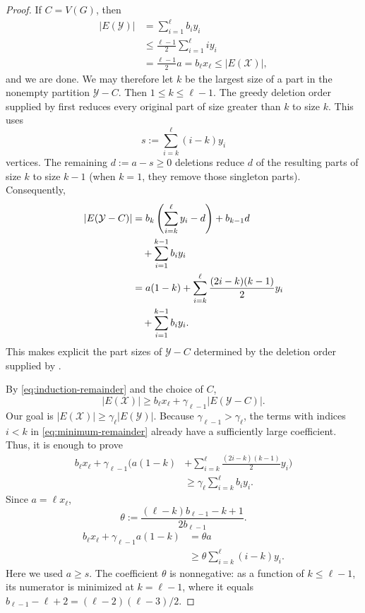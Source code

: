 \documentclass[a4paper,fleqn]{cas-sc}
\theoremstyle{remark}
\theoremstyle{plain}
\begin{document}
\begin{proof}
If $C=V(G)$, then
\begin{align*}
   |E(\mathcal{Y})|
   &=\sum_{i=1}^{\ell}b_i y_i\\
   &\leq \frac{\ell-1}{2}\sum_{i=1}^{\ell}i y_i\\
   &=\frac{\ell-1}{2}a
   =b_\ell x_\ell
   \leq |E(\mathcal{X})|,
\end{align*}
and we are done. We may therefore let $k$ be the largest size of a
part in the nonempty partition $\mathcal{Y}-C$. Then
$1\leq k\leq\ell-1$. The greedy deletion order supplied by
 first reduces every original part of size greater
than $k$ to size $k$. This uses
\[
   s:=\sum_{i=k}^{\ell}(i-k)y_i
\]
vertices. The remaining $d:=a-s\geq 0$ deletions reduce $d$ of the
resulting parts of size $k$ to size $k-1$ (when $k=1$, they remove
those singleton parts). Consequently,
\begin{align}
|E(\mathcal{Y}-C)|
 &=b_k\left(\sum_{i=k}^{\ell}y_i-d\right)
   +b_{k-1}d \notag\\
 &\quad+\sum_{i=1}^{k-1}b_i y_i \notag\\
 &=a(1-k)
   +\sum_{i=k}^{\ell}
      \frac{(2i-k)(k-1)}{2}y_i \notag\\
 &\quad
   +\sum_{i=1}^{k-1}b_i y_i. \label{eq:minimum-remainder}
\end{align}
This makes explicit the part sizes of $\mathcal{Y}-C$ determined by
the deletion order supplied by .

By \eqref{eq:induction-remainder} and the choice of $C$,
\begin{equation} \label{eq:algorithm-lower-bound}
|E(\mathcal{X})|
\geq b_\ell x_\ell+\gamma_{\ell-1}|E(\mathcal{Y}-C)|.
\end{equation}
Our goal is $|E(\mathcal{X})|\geq\gamma_\ell|E(\mathcal{Y})|$.
Because $\gamma_{\ell-1}>\gamma_\ell$, the terms with indices
$i<k$ in \eqref{eq:minimum-remainder} already have a sufficiently
large coefficient. Thus, it is enough to prove
\begin{equation} \label{eq:reduced-target}
\begin{split}
b_\ell x_\ell+\gamma_{\ell-1}\biggl(
a(1-k)&+
\sum_{i=k}^{\ell}\frac{(2i-k)(k-1)}{2}y_i\biggr)\\
&\geq\gamma_\ell\sum_{i=k}^{\ell}b_i y_i.
\end{split}
\end{equation}
Since $a=\ell x_\ell$,
\[
\theta:=\frac{(\ell-k)b_{\ell-1}-k+1}{2b_{\ell-1}}.
\]
\begin{align*}
b_\ell x_\ell+\gamma_{\ell-1}a(1-k)
 &=\theta a\\
 &\geq \theta\sum_{i=k}^{\ell}(i-k)y_i.
\end{align*}
Here we used $a\geq s$. The coefficient $\theta$ is nonnegative: as a
function of $k\leq\ell-1$, its numerator is minimized at
$k=\ell-1$, where it equals
$b_{\ell-1}-\ell+2=(\ell-2)(\ell-3)/2$.


\end{proof}
\end{document}
